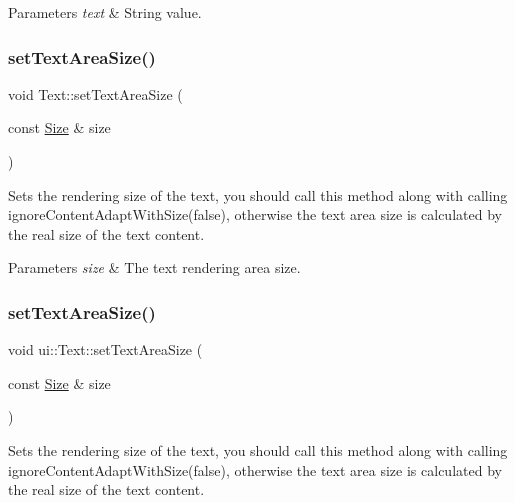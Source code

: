 \begin{DoxyParams}{Parameters}
{\em text} & String value. \\
\hline
\end{DoxyParams}
\mbox{\label{classui_1_1Text_a501a7ded90590c52c4a395d2b721abf3}} 
\subsubsection{\texorpdfstring{set\+Text\+Area\+Size()}{setTextAreaSize()}\hspace{0.1cm}{\footnotesize\ttfamily [1/2]}}
{\footnotesize\ttfamily void Text\+::set\+Text\+Area\+Size (\begin{DoxyParamCaption}\item[{const \hyperlink{classSize}{Size} \&}]{size }\end{DoxyParamCaption})}

Sets the rendering size of the text, you should call this method along with calling {\ttfamily ignore\+Content\+Adapt\+With\+Size(false)}, otherwise the text area size is calculated by the real size of the text content.


\begin{DoxyParams}{Parameters}
{\em size} & The text rendering area size. \\
\hline
\end{DoxyParams}
\mbox{\label{classui_1_1Text_ae4367871d2db2710e945ff052d946406}} 
\subsubsection{\texorpdfstring{set\+Text\+Area\+Size()}{setTextAreaSize()}\hspace{0.1cm}{\footnotesize\ttfamily [2/2]}}
{\footnotesize\ttfamily void ui\+::\+Text\+::set\+Text\+Area\+Size (\begin{DoxyParamCaption}\item[{const \hyperlink{classSize}{Size} \&}]{size }\end{DoxyParamCaption})}

Sets the rendering size of the text, you should call this method along with calling {\ttfamily ignore\+Content\+Adapt\+With\+Size(false)}, otherwise the text area size is calculated by the real size of the text content.


